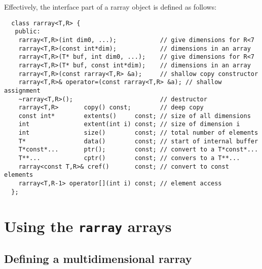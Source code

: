 \documentclass[12pt,twoside]{article}
\begin{document}
Effectively, the interface part of a rarray object is defined as follows:%
\vspace{-8pt}%
\begin{framed}\vspace{-14pt}%
\begin{verbatim}
  class rarray<T,R> {
   public:    
    rarray<T,R>(int dim0, ...);            // give dimensions for R<7
    rarray<T,R>(const int*dim);            // dimensions in an array
    rarray<T,R>(T* buf, int dim0, ...);    // give dimensions for R<7
    rarray<T,R>(T* buf, const int*dim);    // dimensions in an array
    rarray<T,R>(const rarray<T,R> &a);     // shallow copy constructor   
    rarray<T,R>& operator=(const rarray<T,R> &a); // shallow assignment
    ~rarray<T,R>();                        // destructor 
    rarray<T,R>       copy() const;        // deep copy
    const int*        extents()     const; // size of all dimensions 
    int               extent(int i) const; // size of dimension i
    int               size()        const; // total number of elements
    T*                data()        const; // start of internal buffer
    T*const*...       ptr();        const; // convert to a T*const*... 
    T**...            cptr()        const; // convers to a T**... 
    rarray<const T,R>& cref()       const; // convert to const elements
    rarray<T,R-1> operator[](int i) const; // element access
  };
\end{verbatim}
\end{framed}

\section{Using the {\tt rarray} arrays}

\subsection{Defining a multidimensional rarray}
\end{document}
